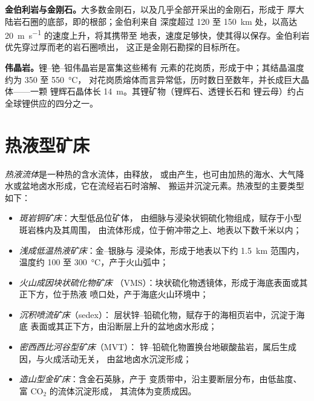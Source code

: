 \textbf{金伯利岩与金刚石。}大多数金刚石，以及几乎全部开采出的金刚石，形成于
厚大陆岩石圈的底部，即的根部；金伯利来自
深度超过 120 至 \qty{150}{km} 处，以高达 \qty{20}{m.s^{-1}} 的速度上升，将其携带至
地表，速度足够快，使其得以保存。金伯利岩优先穿过厚而老的岩石圈喷出，
这正是金刚石勘探的目标所在。

\textbf{伟晶岩。}锂–铯–钽伟晶岩是富集这些稀有
元素的花岗质，形成于中；其结晶温度约为 350 至 \qty{550}{\celsius}，
对花岗质熔体而言异常低，历时数日至数年，并长成巨大晶体——一颗
锂辉石晶体长 \qty{14}{m}。其锂矿物（锂辉石、透锂长石和
锂云母）约占全球锂供应的四分之一。

\section{热液型矿床}\label{sec:b2:ore-deposits:hydrothermal}

\begin{definition}[热液流体与热液型矿床类型]\label{def:b2:ore-deposits:hydrothermal}
\emph{热液流体}是一种热的含水流体，由释放，
或由产生，也可由加热的海水、大气降水或盆地卤水形成，它在流经岩石时溶解、
搬运并沉淀元素。热液型的主要类型
如下：
\begin{itemize}
  \item \emph{斑岩铜矿床}：大型低品位矿体，
        由细脉与浸染状铜硫化物组成，赋存于小型斑岩株内及其周围，
        由流体形成，位于俯冲带之上、地表以下数千米以内；
  \item \emph{浅成低温热液矿床}：金–银脉与
        浸染体，形成于地表以下约 \qty{1.5}{km} 范围内，温度约 100 至
        \qty{300}{\celsius}，产于火山弧中；
  \item \emph{火山成因块状硫化物矿床}
        （VMS）：块状硫化物透镜体，形成于海底表面或其正下方，位于热液
        喷口处，产于海底火山环境中；
  \item \emph{沉积喷流矿床}（sedex）：
        层状锌–铅硫化物，赋存于的海相页岩中，沉淀于海底
        表面或其正下方，由沿断层上升的盆地卤水形成；
  \item \emph{密西西比河谷型矿床}（MVT）：
        锌–铅硫化物置换台地碳酸盐岩，属后生成因，与火成活动无关，
        由盆地卤水沉淀形成；
  \item \emph{造山型金矿床}：含金石英脉，产于
        变质带中，沿主要断层分布，由低盐度、富 CO$_2$ 的流体沉淀形成，
        其流体为变质成因。
\end{itemize}
\end{definition}

